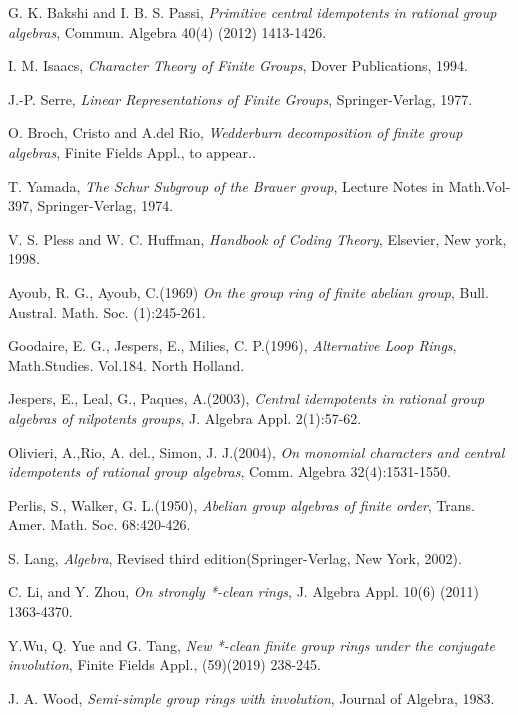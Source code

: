 \documentclass[12pt, reqno]{amsart}
\numberwithin{equation}{section}
\theoremstyle{definition}
\theoremstyle{remark}
\theoremstyle{plain}
\begin{document}
\begin{thebibliography}{}

G. K. Bakshi and I. B. S. Passi, \emph{Primitive central idempotents in rational group algebras}, Commun. Algebra 40(4) (2012) 1413-1426.\smallskip

I. M. Isaacs, \emph{Character Theory of Finite Groups}, Dover Publications, 1994.\smallskip

J.-P. Serre, \emph{Linear Representations of Finite Groups}, Springer-Verlag, 1977.\smallskip

O. Broch, Cristo and A.del Rio, \emph{Wedderburn decomposition of finite group algebras}, Finite Fields Appl., to appear.\smallskip.

T. Yamada, \emph{The Schur Subgroup of the Brauer group}, Lecture Notes in Math.Vol-397, Springer-Verlag, 1974.\smallskip

V. S. Pless and W. C. Huffman, \emph{Handbook of Coding Theory}, Elsevier, New york, 1998.\smallskip

Ayoub, R. G., Ayoub, C.(1969) \emph{On the group ring of finite abelian group}, Bull. Austral. Math. Soc. (1):245-261.\smallskip

Goodaire, E. G., Jespers, E., Milies, C. P.(1996), \emph{Alternative Loop Rings}, Math.Studies. Vol.184. North Holland.\smallskip

Jespers, E., Leal, G., Paques, A.(2003), \emph{Central idempotents in rational group algebras of nilpotents groups}, J. Algebra Appl. 2(1):57-62.\smallskip

Olivieri, A.,Rio, A. del., Simon, J. J.(2004), \emph{On monomial characters and central idempotents of rational group algebras}, Comm. Algebra 32(4):1531-1550.\smallskip

Perlis, S., Walker, G. L.(1950), \emph{Abelian group algebras of finite order}, Trans. Amer. Math. Soc. 68:420-426.\smallskip

S. Lang, \emph{Algebra}, Revised third edition(Springer-Verlag, New York, 2002).\smallskip

C. Li, and Y. Zhou, \emph{On strongly *-clean rings}, J. Algebra Appl. 10(6) (2011) 1363-4370.\smallskip

Y.Wu, Q. Yue and G. Tang, \emph{New *-clean finite group rings under the conjugate involution}, Finite Fields Appl., (59)(2019) 238-245.\smallskip

J. A. Wood, \emph{Semi-simple group rings with involution}, Journal of Algebra, 1983.\smallskip

\end{thebibliography}
\end{document}
